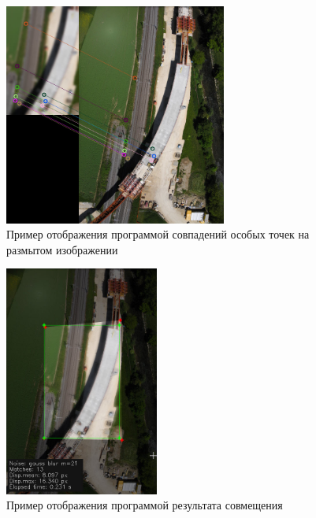 {{   			\newpage
   			\begin{figure}[H]
   				\centering                             
   				\includegraphics[width=0.65\textwidth,keepaspectratio]{samples/blur_matches.jpg}   
   				\centering\caption{ Пример отображения программой совпадений особых точек на размытом изображении }
   				\label{blur_sample 1}                           
   			\end{figure}    
   		
	   		\begin{figure}[H]
	   			\centering                                
	   			\includegraphics[width=0.45\textwidth,keepaspectratio]{samples/blur_result.jpg}       
	   			\centering\caption{ Пример отображения программой результата совмещения}
	   			\label{blur sample 2}                           
	   		\end{figure}    
   			\newpage
   			
}}
